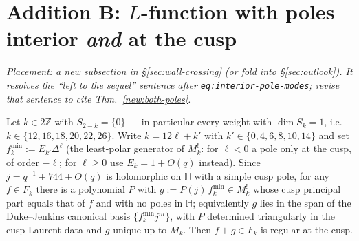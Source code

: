 \documentclass[11pt]{article}
\newcommand{\HH}{\mathbb{H}}\newcommand{\ZZ}{\mathbb{Z}}
\begin{document}
\section{Addition B: $L$-function with poles interior \emph{and} at the cusp}
\noindent\emph{Placement: a new subsection in \S\ref{sec:wall-crossing}
(or fold into \S\ref{sec:outlook}). It resolves the ``left to the
sequel'' sentence after \texttt{eq:interior-pole-modes}; revise that
sentence to cite Thm.~\ref{new:both-poles}.}

\begin{lemma}\label{new:cusp-match}
Let $k\in 2\ZZ$ with $S_{2-k}=\{0\}$ --- in particular every weight
with $\dim S_k=1$, i.e.\ $k\in\{12,16,18,20,22,26\}$. Write
$k=12\ell+k'$ with $k'\in\{0,4,6,8,10,14\}$ and set
$f_k^{\min}:=E_{k'}\Delta^{\ell}$ (the least-polar generator of
$M_k^!$: for $\ell<0$ a pole only at the cusp, of order $-\ell$; for
$\ell\ge 0$ use $E_k=1+O(q)$ instead). Since $j=q^{-1}+744+O(q)$ is
holomorphic on $\HH$ with a simple cusp pole, for any $f\in F_k$ there
is a polynomial $P$ with $g:=P(j)\,f_k^{\min}\in M_k^!$ whose cusp
principal part equals that of $f$ and with no poles in $\HH$;
equivalently $g$ lies in the span of the Duke--Jenkins canonical basis
$\{f_k^{\min}j^m\}$, with $P$ determined triangularly in the cusp
Laurent data and $g$ unique up to $M_k$. Then $f+g\in F_k$ is regular
at the cusp.
\end{lemma}
\end{document}
